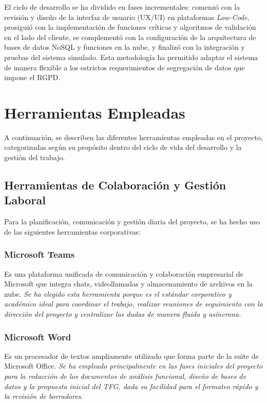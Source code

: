 El ciclo de desarrollo se ha dividido en fases incrementales: comenzó con la revisión y diseño de la interfaz de usuario (UX/UI) en plataformas \textit{Low-Code}, prosiguió con la implementación de funciones críticas y algoritmos de validación en el lado del cliente, se complementó con la configuración de la arquitectura de bases de datos NoSQL y funciones en la nube, y finalizó con la integración y pruebas del sistema simulado. Esta metodología ha permitido adaptar el sistema de manera flexible a los estrictos requerimientos de segregación de datos que impone el RGPD.


\section{Herramientas Empleadas} \label{sct:herramientas}

A continuación, se describen las diferentes herramientas empleadas en el proyecto, categorizadas según su propósito dentro del ciclo de vida del desarrollo y la gestión del trabajo.

\subsection{Herramientas de Colaboración y Gestión Laboral} \label{subsct:herramientas_gestion}

Para la planificación, comunicación y gestión diaria del proyecto, se ha hecho uso de las siguientes herramientas corporativas:

\subsubsection{Microsoft Teams}
Es una plataforma unificada de comunicación y colaboración empresarial de Microsoft que integra chats, videollamadas y almacenamiento de archivos en la nube. \textit{Se ha elegido esta herramienta porque es el estándar corporativo y académico ideal para coordinar el trabajo, realizar reuniones de seguimiento con la dirección del proyecto y centralizar las dudas de manera fluida y asíncrona.}

\subsubsection{Microsoft Word}
Es un procesador de textos ampliamente utilizado que forma parte de la suite de Microsoft Office. \textit{Se ha empleado principalmente en las fases iniciales del proyecto para la redacción de los documentos de análisis funcional, diseño de bases de datos y la propuesta inicial del TFG, dada su facilidad para el formateo rápido y la revisión de borradores}.

